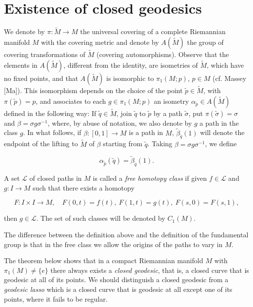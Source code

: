 \section{Existence of closed geodesics}

We denote by $\pi:\tilde{M}\to M$ the universal covering of a complete Riemannian
manifold $M$ with the covering metric and denote by $A(\tilde{M})$ the group of
covering transformations of $\tilde{M}$ (covering automorphisms). Observe that
the elements in $A(\tilde{M})$, different from the identity, are isometries of
$\tilde{M}$, which have no fixed points, and that $A(\tilde{M})$ is isomorphic to
$\pi_1(M;p)$, $p\in M$ (cf. Massey [Ma]). This isomorphism depends on the choice
of the point $\tilde{p}\in\tilde{M}$, with $\pi(\tilde{p})=p$, and associates to
each $g\in\pi_1(M;p)$ an isometry $\alpha_{\tilde{p}}\in A(\tilde{M})$ defined in
the following way: If $\tilde{q}\in\tilde{M}$, join $\tilde{q}$ to $\tilde{p}$ by
a path $\tilde{\sigma}$, put $\pi(\tilde{\sigma})=\sigma$ and
$\beta=\sigma g\sigma^{-1}$, where, by abuse of notation, we also denote by $g$ a
path in the class $g$. In what follows, if $\beta:[0,1]\to M$ is a path in $M$,
$\tilde{\beta}_{\tilde{q}}(1)$ will denote the endpoint of the lifting to
$\tilde{M}$ of $\beta$ starting from $\tilde{q}$. Taking $\beta=\sigma g\sigma^{-1}$,
we define

$$
\alpha_{\tilde{p}}(\tilde{q})=\tilde{\beta}_{\tilde{q}}(1).
$$

\begin{definition}
  \label{def:dc-ch12-2-1}
  A set $\mathcal{L}$ of closed paths in $M$ is called a \emph{free homotopy class} if
  given $f\in\mathcal{L}$ and $g:I\to M$ such that there exists a homotopy
  
  $$
  F:I\times I\to M,\quad F(0,t)=f(t),\ F(1,t)=g(t),\ F(s,0)=F(s,1),
  $$
  
  then $g\in\mathcal{L}$. The set of such classes will be denoted by $C_1(M)$.
  
  The difference between the definition above and the definition of the fundamental
  group is that in the free class we allow the origins of the paths to vary in $M$.
  
  The theorem below shows that in a compact Riemannian manifold $M$ with
  $\pi_1(M)\neq\{e\}$ there always exists a \emph{closed geodesic}, that is, a closed
  curve that is geodesic at all of its points. We should distinguish a closed
  geodesic from a \emph{geodesic lasso} which is a closed curve that is geodesic at all
  except one of its points, where it fails to be regular.
\end{definition}

